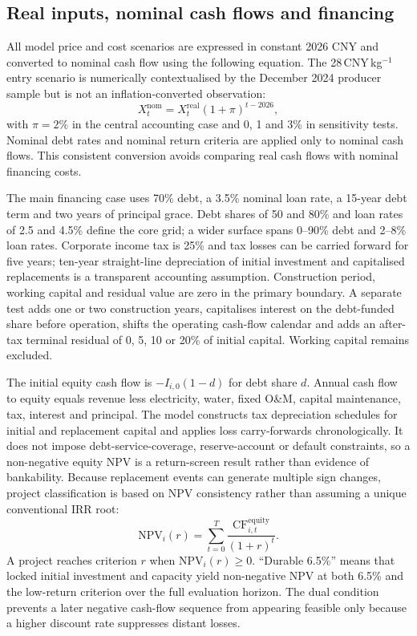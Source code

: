 \documentclass[pdflatex,sn-nature]{sn-jnl}
\begin{document}
\subsection{Real inputs, nominal cash flows and financing}

All model price and cost scenarios are expressed in constant 2026 CNY and converted to nominal cash flow using the following equation. The 28\,CNY\,kg$^{-1}$ entry scenario is numerically contextualised by the December 2024 producer sample but is not an inflation-converted observation:
\begin{equation}
X_t^{\mathrm{nom}}=X_t^{\mathrm{real}}(1+\pi)^{t-2026},
\label{eq:nominalisation}
\end{equation}
with $\pi=2\%$ in the central accounting case and 0, 1 and 3\% in sensitivity tests. Nominal debt rates and nominal return criteria are applied only to nominal cash flows. This consistent conversion avoids comparing real cash flows with nominal financing costs.

The main financing case uses 70\% debt, a 3.5\% nominal loan rate, a 15-year debt term and two years of principal grace. Debt shares of 50 and 80\% and loan rates of 2.5 and 4.5\% define the core grid; a wider surface spans 0--90\% debt and 2--8\% loan rates. Corporate income tax is 25\% and tax losses can be carried forward for five years; ten-year straight-line depreciation of initial investment and capitalised replacements is a transparent accounting assumption. Construction period, working capital and residual value are zero in the primary boundary. A separate test adds one or two construction years, capitalises interest on the debt-funded share before operation, shifts the operating cash-flow calendar and adds an after-tax terminal residual of 0, 5, 10 or 20\% of initial capital. Working capital remains excluded.

The initial equity cash flow is $-I_{i,0}(1-d)$ for debt share $d$. Annual cash flow to equity equals revenue less electricity, water, fixed O\&M, capital maintenance, tax, interest and principal. The model constructs tax depreciation schedules for initial and replacement capital and applies loss carry-forwards chronologically. It does not impose debt-service-coverage, reserve-account or default constraints, so a non-negative equity NPV is a return-screen result rather than evidence of bankability. Because replacement events can generate multiple sign changes, project classification is based on NPV consistency rather than assuming a unique conventional IRR root:
\begin{equation}
\mathrm{NPV}_i(r)=\sum_{t=0}^{T}\frac{\mathrm{CF}_{i,t}^{\mathrm{equity}}}{(1+r)^t}.
\label{eq:npv}
\end{equation}
A project reaches criterion $r$ when $\mathrm{NPV}_i(r)\geq0$. ``Durable 6.5\%'' means that locked initial investment and capacity yield non-negative NPV at both 6.5\% and the low-return criterion over the full evaluation horizon. The dual condition prevents a later negative cash-flow sequence from appearing feasible only because a higher discount rate suppresses distant losses.
\end{document}
